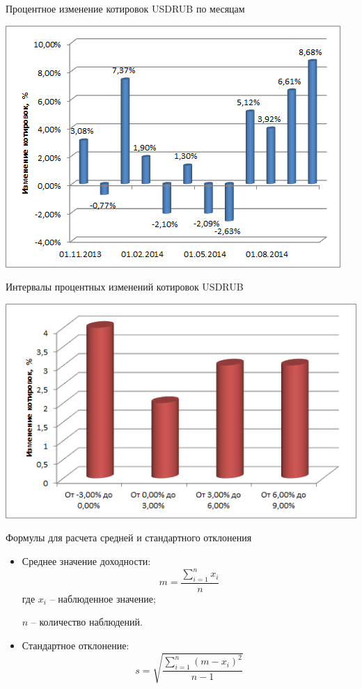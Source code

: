\documentclass[financial_risks_lectures.tex]{subfiles}
\begin{document}
\begin{frame}{Процентное изменение котировок USDRUB по месяцам}
\begin{center}
\includegraphics[scale=0.8]{img/usdrubdeltaperc}
\end{center}
\end{frame}
\begin{frame}{Интервалы процентных изменений котировок  USDRUB}
\begin{center}
\includegraphics[scale=0.8]{img/usdrubquotesintervals}
\end{center}
\end{frame}
\begin{frame}{Формулы для расчета средней и стандартного отклонения}
\begin{itemize}[<+->]
\item
Среднее значение доходности:
$$m=\frac{\sum_{i=1}^n x_i}{n}$$
где $x_i$ – наблюденное значение;

$n$ – количество наблюдений.
\item
Стандартное отклонение:
$$s=\sqrt{\frac{\sum_{i=1}^n (m-x_i)^2}{n-1}}$$
\end{itemize}
\end{frame}
\end{document}
